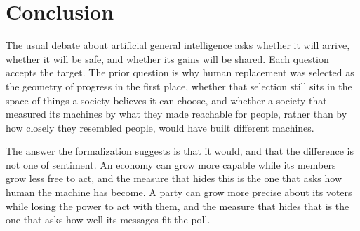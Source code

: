 \documentclass[11pt]{article}
\begin{document}
\section{Conclusion}

The usual debate about artificial general intelligence asks whether it will arrive, whether it will be safe, and whether its gains will be shared. Each question accepts the target. The prior question is why human replacement was selected as the geometry of progress in the first place, whether that selection still sits in the space of things a society believes it can choose, and whether a society that measured its machines by what they made reachable for people, rather than by how closely they resembled people, would have built different machines.

The answer the formalization suggests is that it would, and that the difference is not one of sentiment. An economy can grow more capable while its members grow less free to act, and the measure that hides this is the one that asks how human the machine has become. A party can grow more precise about its voters while losing the power to act with them, and the measure that hides that is the one that asks how well its messages fit the poll.
\end{document}
